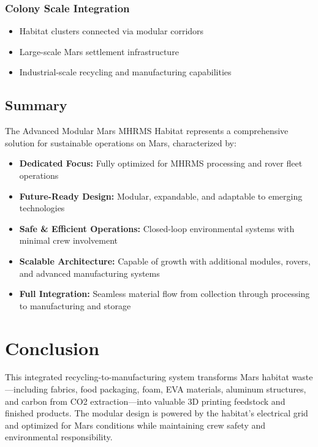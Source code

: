 \documentclass[12pt, a4paper]{article}
\begin{document}
\subsubsection{Colony Scale Integration}
\begin{itemize}
    \item Habitat clusters connected via modular corridors
    \item Large-scale Mars settlement infrastructure
    \item Industrial-scale recycling and manufacturing capabilities
\end{itemize}

\subsection{Summary}

The Advanced Modular Mars MHRMS Habitat represents a comprehensive solution for sustainable operations on Mars, characterized by:

\begin{itemize}
    \item \textbf{Dedicated Focus:} Fully optimized for MHRMS processing and rover fleet operations
    \item \textbf{Future-Ready Design:} Modular, expandable, and adaptable to emerging technologies
    \item \textbf{Safe \& Efficient Operations:} Closed-loop environmental systems with minimal crew involvement
    \item \textbf{Scalable Architecture:} Capable of growth with additional modules, rovers, and advanced manufacturing systems
    \item \textbf{Full Integration:} Seamless material flow from collection through processing to manufacturing and storage
\end{itemize}

\section{Conclusion}

This integrated recycling-to-manufacturing system transforms Mars habitat waste—including fabrics, food packaging, foam, EVA materials, aluminum structures, and carbon from CO2 extraction—into valuable 3D printing feedstock and finished products. The modular design is powered by the habitat's electrical grid and optimized for Mars conditions while maintaining crew safety and environmental responsibility.
\end{document}
